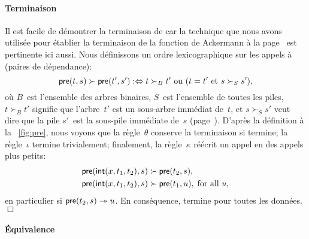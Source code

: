 \paragraph{Terminaison}

Il est facile de démontrer la terminaison de
 car la technique que nous avons
utilisée pour établier la terminaison de la fonction de Ackermann à la
page~\pageref{par:ackermann} est pertinente ici aussi. Nous
définissons un ordre lexicographique sur les appels à 
(paires de dépendance):
\begin{equation}
\textsf{pre}(t,s) \succ \textsf{pre}(t',s') :\Leftrightarrow \text{\(t
  \succ_{B} t'\) ou (\(t = t'\) et \(s \succ_{S} s'\))},
\label{eq:BS_order}
\end{equation}
où \(B\)~est l'ensemble des arbres binaires, \(S\)~est l'ensemble de
toutes les piles, \(t \succ_{B} t'\) signifie que l'arbre~\(t'\) est
un sous-arbre immédiat
de~\(t\), et \(s \succ_{S} s'\) veut dire que la pile \(s'\)~est la
sous-pile immédiate
de~\(s\) (page~\pageref{par:well-founded}). D'après la définition à la
\fig~\vref{fig:pre}, nous voyons que la règle~\(\theta\) conserve la
terminaison si  termine; la
règle~\(\iota\) termine trivialement; finalement, la règle~\(\kappa\)
réécrit un appel en des appels plus petits:
\begin{align*}
  \textsf{pre}(\textsf{int}(x,t_1,t_2),s) &\succ \textsf{pre}(t_2,s),\\
  \textsf{pre}(\textsf{int}(x,t_1,t_2),s) &\succ \textsf{pre}(t_1,u),\; \text{for
    all~\(u\),}
\end{align*}
en particulier si \(\textsf{pre}(t_2,s) \twoheadrightarrow u\). En
conséquence,  termine pour toutes
les données.\hfill\(\Box\)

\paragraph{Équivalence}

